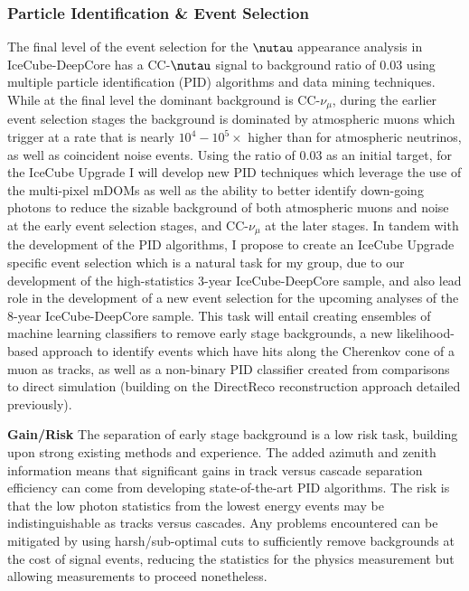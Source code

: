 \documentclass[a4paper,11pt]{article}
\begin{document}
\subsubsection{Particle Identification \& Event Selection}
The final level of the event selection for the $\nutau$ appearance analysis in IceCube-DeepCore\cite{Aartsen:2019tjl} has a CC-$\nutau$ signal to background ratio of $0.03$ using multiple particle identification (PID) algorithms and data mining techniques. While at the final level the dominant background is CC-$\nu_\mu$, during the earlier event selection stages the background is dominated by atmospheric muons which trigger at a rate that is nearly $10^{4}-10^{5}\times$ higher than for atmospheric neutrinos, as well as coincident noise events. Using the ratio of 0.03 as an initial target, for the IceCube Upgrade I will develop new PID techniques which leverage the use of the multi-pixel mDOMs as well as the ability to better identify down-going photons to reduce the sizable background of both atmospheric muons and noise at the early event selection stages, and CC-$\nu_\mu$ at the later stages. In tandem with the development of the PID algorithms, I propose to create an IceCube Upgrade specific event selection which is a natural task for my group, due to our development of the high-statistics 3-year IceCube-DeepCore sample, and also lead role in the development of a new event selection for the upcoming analyses of the 8-year IceCube-DeepCore sample. This task will entail creating ensembles of machine learning classifiers to remove early stage backgrounds, a new likelihood-based approach to identify events which have hits along the Cherenkov cone of a muon as tracks, as well as a non-binary PID classifier created from comparisons to direct simulation (building on the DirectReco reconstruction approach detailed previously).

\textbf{Gain/Risk} The separation of early stage background is a low risk task, building upon strong existing methods and experience. The added azimuth and zenith information means that significant gains in track versus cascade separation efficiency can come from developing state-of-the-art PID algorithms. The risk is that the low photon statistics from the lowest energy events may be indistinguishable as tracks versus cascades. Any problems encountered can be mitigated by using harsh/sub-optimal cuts to sufficiently remove backgrounds at the cost of signal events, reducing the statistics for the physics measurement but allowing measurements to proceed nonetheless.
\end{document}
